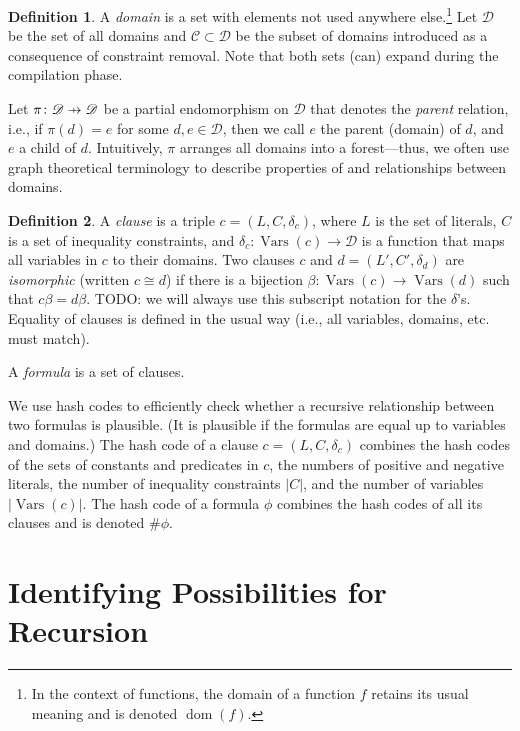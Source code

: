 \documentclass{article}
\theoremstyle{definition}
\newtheorem{definition}{Definition}
\newcommand\pfun{\mathrel{\ooalign{\hfil$\mapstochar\mkern5mu$\hfil\cr$\to$\cr}}}
\DeclareMathOperator{\dom}{dom}
\DeclareMathOperator{\Vars}{Vars}
\begin{document}
\begin{definition}
  A \emph{domain} is a set with elements not used anywhere else.\footnote{In the context of functions, the domain of a function $f$ retains its usual meaning and is denoted $\dom(f)$.} Let $\mathscr{D}$ be the set of all domains and $\mathscr{C} \subset \mathscr{D}$ be the subset of domains introduced as a consequence of constraint removal. Note that both sets (can) expand during the compilation phase.

Let $\pi\colon \mathscr{D} \pfun \mathscr{D}$ be a partial endomorphism on $\mathscr{D}$ that denotes the \emph{parent} relation, i.e., if $\pi(d) = e$ for some $d, e \in \mathscr{D}$, then we call $e$ the parent (domain) of $d$, and $e$ a child of $d$. Intuitively, $\pi$ arranges all domains into a forest---thus, we often use graph theoretical terminology to describe properties of and relationships between domains.
\end{definition}

\begin{definition}
  A \emph{clause} is a triple $c = (L, C, \delta_c)$, where $L$ is the set of literals, $C$ is a set of inequality constraints, and $\delta_c\colon \Vars(c) \to \mathscr{D}$ is a function that maps all variables in $c$ to their domains. Two clauses $c$ and $d = (L', C', \delta_d)$ are \emph{isomorphic} (written $c \cong d$) if there is a bijection $\beta\colon \Vars(c) \to \Vars(d)$ such that $c\beta = d\beta$. TODO: we will always use this subscript notation for the $\delta$'s. Equality of clauses is defined in the usual way (i.e., all variables, domains, etc. must match).
\end{definition}

A \emph{formula} is a set of clauses.

We use hash codes to efficiently check whether a recursive relationship between two formulas is plausible. (It is plausible if the formulas are equal up to variables and domains.) The hash code of a clause $c = (L, C, \delta_c)$ combines the hash codes of the sets of constants and predicates in $c$, the numbers of positive and negative literals, the number of inequality constraints $|C|$, and the number of variables $|\Vars(c)|$. The hash code of a formula $\phi$ combines the hash codes of all its clauses and is denoted $\#\phi$.

\section{Identifying Possibilities for Recursion}
\end{document}
